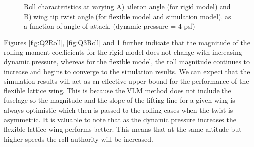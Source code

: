 \documentclass[11pt]{ucthesis}
\begin{document}
\begin{figure}[thpb]
\hfill
{}
\hfill
{}
\hfill
\caption{Roll characteristics at varying A) aileron angle (for rigid model) and B) wing tip twist angle (for flexible model and simulation model), as a function of angle of attack. (dynamic pressure = 4 psf)}
\label{fig:Q4Roll}
\end{figure}

Figures \ref{fig:Q2Roll}, \ref{fig:Q3Roll} and \ref{fig:Q4Roll} further indicate that the magnitude of the rolling moment coefficients for the rigid model does not change with increasing dynamic pressure, whereas for the flexible model, the roll magnitude continues to increase and begins to converge to the simulation results. We can expect that the simulation results will act as an effective upper bound for the performance of the flexible lattice wing. This is because the VLM method does not include the fuselage so the magnitude and the slope of the lifting line for a given wing is always optimistic which then is passed to the rolling cases when the twist is asymmetric. It is valuable to note that as the dynamic pressure increases the flexible lattice wing performs better. This means that at the same altitude but higher speeds the roll authority will be increased.
\end{document}
